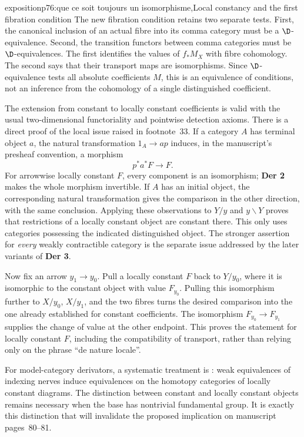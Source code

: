\begin{dcomment}{exposition}{p76:que ce soit toujours un isomorphisme,}{Local constancy and the first fibration condition}
The new fibration condition retains two separate tests. First, the canonical inclusion of an actual fibre into its comma category must be a $\D$-equivalence. Second, the transition functors between comma categories must be $\D$-equivalences. The first identifies the values of $f_*M_X$ with fibre cohomology. The second says that their transport maps are isomorphisms. Since $\D$-equivalence tests all absolute coefficients $M$, this is an equivalence of conditions, not an inference from the cohomology of a single distinguished coefficient.

The extension from constant to locally constant coefficients is valid with the usual two-dimensional functoriality and pointwise detection axioms. There is a direct proof of the local issue raised in footnote~33. If a category $A$ has terminal object $a$, the natural transformation $1_A\to ap$ induces, in the manuscript's presheaf convention, a morphism
\[
 p^*a^*F\longrightarrow F.
\]
For arrowwise locally constant $F$, every component is an isomorphism; \textbf{Der 2} makes the whole morphism invertible. If $A$ has an initial object, the corresponding natural transformation gives the comparison in the other direction, with the same conclusion. Applying these observations to $Y/y$ and $y\backslash Y$ proves that restrictions of a locally constant object are constant there. This only uses categories possessing the indicated distinguished object. The stronger assertion for \emph{every} weakly contractible category is the separate issue addressed by the later variants of \textbf{Der 3}.

Now fix an arrow $y_1\to y_0$. Pull a locally constant $F$ back to $Y/y_0$, where it is isomorphic to the constant object with value $F_{y_0}$. Pulling this isomorphism further to $X/y_0$, $X/y_1$, and the two fibres turns the desired comparison into the one already established for constant coefficients. The isomorphism $F_{y_0}\to F_{y_1}$ supplies the change of value at the other endpoint. This proves the statement for locally constant $F$, including the compatibility of transport, rather than relying only on the phrase ``de nature locale''.

For model-category derivators, a systematic treatment is \citet[Theorem~1.3 and Section~3]{Cisinski2009LocallyConstant}: weak equivalences of indexing nerves induce equivalences on the homotopy categories of locally constant diagrams. The distinction between constant and locally constant objects remains necessary when the base has nontrivial fundamental group. It is exactly this distinction that will invalidate the proposed implication on manuscript pages~80--81.
\end{dcomment}

